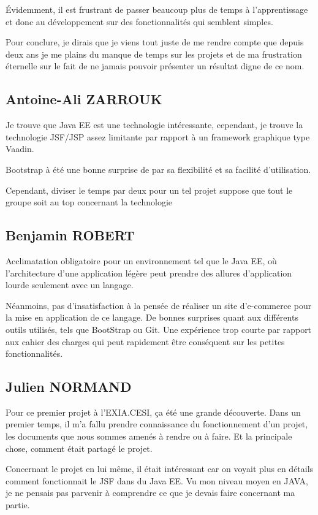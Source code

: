 Évidemment, il est frustrant de passer beaucoup plus de temps à l’apprentissage et donc au développement sur des fonctionnalités qui semblent simples.

Pour conclure, je dirais que je viens tout juste de me rendre compte que depuis deux ans je me plains du manque de temps sur les projets et de ma frustration éternelle sur le fait de ne jamais pouvoir présenter un résultat digne de ce nom.

\subsection{Antoine-Ali ZARROUK}
Je trouve que Java EE est une technologie intéressante, cependant, je trouve la technologie JSF/JSP assez limitante par rapport à un framework graphique type Vaadin.

Bootstrap à été une bonne surprise de par sa flexibilité et sa facilité d'utilisation.

Cependant, diviser le temps par deux pour un tel projet suppose que tout le groupe soit au top concernant la technologie

\subsection{Benjamin ROBERT}
Acclimatation obligatoire pour un environnement tel que le Java EE, où l'architecture d'une application légère peut prendre des allures d'application lourde seulement avec un langage.

Néanmoins, pas d'insatisfaction à la pensée de réaliser un site d'e-commerce pour la mise en application de ce langage. De bonnes surprises quant aux différents outils utilisés, tels que BootStrap ou Git. Une expérience trop courte par rapport aux cahier des charges qui peut rapidement être conséquent sur les petites fonctionnalités.

\subsection{Julien NORMAND}
Pour ce premier projet à l'EXIA.CESI, ça été une grande découverte. Dans un premier temps, il m'a fallu prendre connaissance du fonctionnement d'un projet, les documents que nous sommes amenés à rendre ou à faire. Et la principale chose, comment était partagé le projet.

Concernant le projet en lui même, il était intéressant car on voyait plus en détails comment fonctionnait le JSF dans du Java EE. Vu mon niveau moyen en JAVA, je ne pensais pas parvenir à comprendre ce que je devais faire concernant ma partie.


